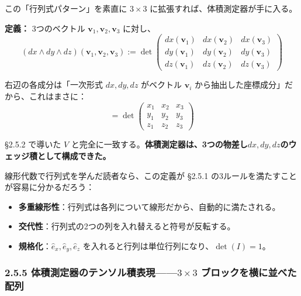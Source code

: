 \documentclass[a4paper,12pt,openany]{book}
\begin{document}
この「行列式パターン」を素直に \(3 \times 3\)
に拡張すれば、体積測定器が手に入る。

\textbf{定義：} 3つのベクトル
\(\mathbf{v}_1, \mathbf{v}_2, \mathbf{v}_3\) に対し、
\[(dx \wedge dy \wedge dz)(\mathbf{v}_1, \mathbf{v}_2, \mathbf{v}_3) := \det\begin{pmatrix} dx(\mathbf{v}_1) & dx(\mathbf{v}_2) & dx(\mathbf{v}_3) \\ dy(\mathbf{v}_1) & dy(\mathbf{v}_2) & dy(\mathbf{v}_3) \\ dz(\mathbf{v}_1) & dz(\mathbf{v}_2) & dz(\mathbf{v}_3) \end{pmatrix}\]

右辺の各成分は「一次形式 \(dx, dy, dz\) がベクトル \(\mathbf{v}_i\)
から抽出した座標成分」だから、これはまさに：
\[= \det\begin{pmatrix} x_1 & x_2 & x_3 \\ y_1 & y_2 & y_3 \\ z_1 & z_2 & z_3 \end{pmatrix}\]

§2.5.2 で導いた \(V\)
と完全に一致する。\textbf{体積測定器は、3つの物差し}\(dx, dy, dz\)\textbf{のウェッジ積として構成できた。}

線形代数で行列式を学んだ読者なら、この定義が §2.5.1
の3ルールを満たすことが容易に分かるだろう：

\begin{itemize}
\item
  \textbf{多重線形性}：行列式は各列について線形だから、自動的に満たされる。
\item
  \textbf{交代性}：行列式の2つの列を入れ替えると符号が反転する。
\item
  \textbf{規格化}：\(\hat{e}_x, \hat{e}_y, \hat{e}_z\)
  を入れると行列は単位行列になり、\(\det(I) = 1\)。
\end{itemize}

\hypertarget{ux4f53ux7a4dux6e2cux5b9aux5668ux306eux30c6ux30f3ux30bdux30ebux7a4dux8868ux73fe3-times-3-ux30d6ux30edux30c3ux30afux3092ux6a2aux306bux4e26ux3079ux305fux914dux5217}{%
\subsubsection{\texorpdfstring{2.5.5
体積測定器のテンソル積表現——\(3 \times 3\)
ブロックを横に並べた配列}{2.5.5 体積測定器のテンソル積表現——3 \textbackslash times 3 ブロックを横に並べた配列}}\label{ux4f53ux7a4dux6e2cux5b9aux5668ux306eux30c6ux30f3ux30bdux30ebux7a4dux8868ux73fe3-times-3-ux30d6ux30edux30c3ux30afux3092ux6a2aux306bux4e26ux3079ux305fux914dux5217}}
\end{document}

